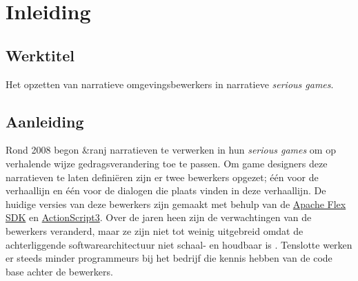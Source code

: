 \documentclass{report}
\newcommand{\organisation}{\&ranj}
\begin{document}
\newpage

\tableofcontents

\chapter{Inleiding}
\section{Werktitel}
Het opzetten van narratieve omgevingsbewerkers in narratieve \emph{serious games}.

\section{Aanleiding} %

Rond 2008 begon \organisation{} narratieven te verwerken in hun \emph{serious games} om op verhalende wijze gedragsverandering toe te passen. Om game designers deze narratieven te laten defini{\"e}ren zijn er twee bewerkers opgezet; {\'e}{\'e}n voor de verhaallijn en {\'e}{\'e}n voor de dialogen die plaats vinden in deze verhaallijn. De huidige versies van deze bewerkers zijn gemaakt met behulp van de \href{https://en.wikipedia.org/wiki/Apache_Flex}{Apache Flex SDK} en \href{http://www.adobe.com/devnet/actionscript/articles/actionscript3_overview.html}{ActionScript3}.
Over de jaren heen zijn de verwachtingen van de bewerkers veranderd, maar ze zijn niet tot weinig uitgebreid omdat de achterliggende softwarearchitectuur niet schaal- en houdbaar is \cite{interviewivo}. Tenslotte werken er steeds minder programmeurs bij het bedrijf die kennis hebben van de code base achter de bewerkers.
\end{document}
